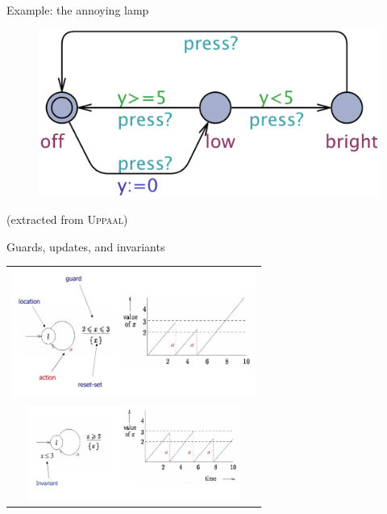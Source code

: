 \documentclass{beamer}
\def\uppaal{\textsc{Uppaal}}
\begin{document}
\begin{frame}{Example: the annoying lamp}
  
\begin{figure}[htb]
  \centering
  \includegraphics[scale=0.35]{./images/Lamp.pdf}\\
\end{figure}

\centering
{\scriptsize (extracted from \uppaal)}

\end{frame}

\begin{slide}{Guards, updates, and invariants}
\small \centering

\begin{tabular}{c}
   \includegraphics[width=8cm]{./images/model0.jpg} \\  \includegraphics[width=7cm]{./images/model1.jpg}
\end{tabular}

\end{slide}
\end{document}
